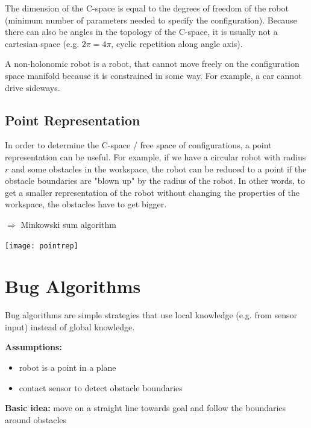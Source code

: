 \begin{multicols*}{2}
The dimension of the C-space is equal to the degrees of freedom of the robot (minimum number of parameters needed to specify the configuration). Because there can also be angles in the topology of the C-space, it is usually not a cartesian space (e.g. $2\pi = 4\pi$, cyclic repetition along angle axis).

A non-holonomic robot is a robot, that cannot move freely on the
configuration space manifold because it is constrained in some way. For example, a car cannot drive sideways.

\subsection{Point Representation}
In order to determine the C-space / free space of configurations, a point representation can be useful. For example, if we have a circular robot with radius $r$ and some obstacles in the workspace, the robot can be reduced to a point if the obstacle boundaries are "blown up" by the radius of the robot. In other words, to get a smaller representation of the robot without changing the properties of the workspace, the obstacles have to get bigger. 

$\Rightarrow$ Minkowski sum algorithm


\texttt{[image: pointrep]}

\section{Bug Algorithms}
Bug algorithms are simple strategies that use local knowledge (e.g. from sensor input) instead of global knowledge.

\textbf{Assumptions: }
\begin{itemize}
	\item robot is a point in a plane
	\item contact sensor to detect obstacle boundaries
\end{itemize}

\textbf{Basic idea:} move on a straight line towards goal and follow the boundaries around obstacles


\end{multicols*}
